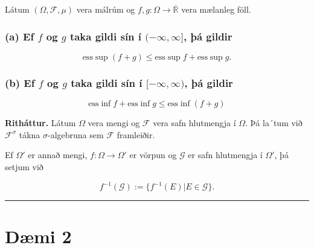 \documentclass[]{book}
\begin{document}
Látum \((\Omega, \mathcal F, \mu)\) vera málrúm og \(f, g:\Omega \rightarrow \overline{\mathbb R}\) vera mælanleg föll.

\hypertarget{a-ef-f-og-g-taka-gildi-sin-i--infty-infty-a-gildir}{%
\subsubsection*{\texorpdfstring{(a) Ef \(f\) og \(g\) taka gildi sín í \((-\infty, \infty]\), þá gildir}{(a) Ef f og g taka gildi sín í (-\textbackslash{}infty, \textbackslash{}infty{]}, þá gildir}}\label{a-ef-f-og-g-taka-gildi-sin-i--infty-infty-a-gildir}}
\addcontentsline{toc}{subsubsection}{(a) Ef \(f\) og \(g\) taka gildi sín í \((-\infty, \infty]\), þá gildir}

\[
\text{ess}\sup(f + g) \leq \text{ess}\sup f + \text{ess}\sup g.
\]

\hypertarget{b-ef-f-og-g-taka-gildi-sin-i--infty-infty-a-gildir}{%
\subsubsection*{\texorpdfstring{(b) Ef \(f\) og \(g\) taka gildi sín í \([-\infty, \infty)\), þá gildir}{(b) Ef f og g taka gildi sín í {[}-\textbackslash{}infty, \textbackslash{}infty), þá gildir}}\label{b-ef-f-og-g-taka-gildi-sin-i--infty-infty-a-gildir}}
\addcontentsline{toc}{subsubsection}{(b) Ef \(f\) og \(g\) taka gildi sín í \([-\infty, \infty)\), þá gildir}

\[
\text{ess}\inf f + \text{ess}\inf g \leq \text{ess} \inf(f + g)
\]

\textbf{Ritháttur.} Látum \(\Omega\) vera mengi og \(\mathcal F\) vera safn hlutmengja í \(\Omega\). Þá la´tum við \(\mathcal F^\sigma\) tákna \(\sigma\)-algebruna sem \(\mathcal F\) framleiðir.

Ef \(\Omega'\) er annað mengi, \(f:\Omega \rightarrow \Omega'\) er vörpun og \(\mathcal G\) er safn hlutmengja í \(\Omega'\), þá setjum við

\[
f^{-1}(\mathcal G) := \{f^{-1}(E) | E \in \mathcal G\}.
\]

\begin{center}\rule{0.5\linewidth}{\linethickness}\end{center}

\hypertarget{dmi-2-4}{%
\section*{Dæmi 2}\label{dmi-2-4}}
\end{document}
